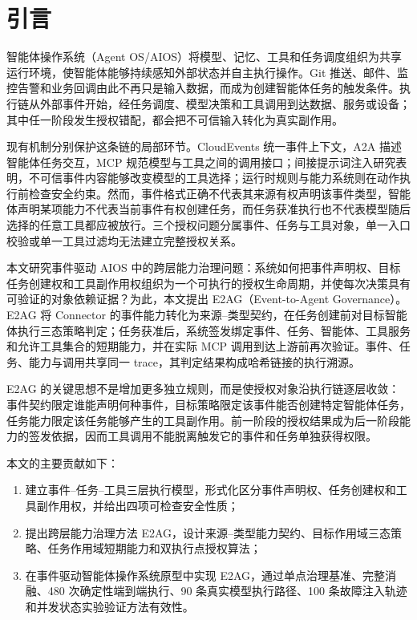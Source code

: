 \section{引言}\label{sec:introduction-v1}

智能体操作系统（Agent OS/AIOS）将模型、记忆、工具和任务调度组织为共享运行环境，使智能体能够持续感知外部状态并自主执行操作\cite{aios,agent-survey}。Git 推送、邮件、监控告警和业务回调由此不再只是输入数据，而成为创建智能体任务的触发条件。执行链从外部事件开始，经任务调度、模型决策和工具调用到达数据、服务或设备；其中任一阶段发生授权错配，都会把不可信输入转化为真实副作用。

现有机制分别保护这条链的局部环节。CloudEvents 统一事件上下文，A2A 描述智能体任务交互，MCP 规范模型与工具之间的调用接口\cite{cloudevents,a2a,mcp}；间接提示词注入研究表明，不可信事件内容能够改变模型的工具选择\cite{indirect-pi,injecagent,agentdojo}；运行时规则与能力系统则在动作执行前检查安全约束\cite{agentspec,camel}。然而，事件格式正确不代表其来源有权声明该事件类型，智能体声明某项能力不代表当前事件有权创建任务，而任务获准执行也不代表模型随后选择的任意工具都应被放行。三个授权问题分属事件、任务与工具对象，单一入口校验或单一工具过滤均无法建立完整授权关系。

本文研究事件驱动 AIOS 中的跨层能力治理问题：系统如何把事件声明权、目标任务创建权和工具副作用权组织为一个可执行的授权生命周期，并使每次决策具有可验证的对象依赖证据？为此，本文提出 E2AG（Event-to-Agent Governance）。E2AG 将 Connector 的事件能力转化为来源--类型契约，在任务创建前对目标智能体执行三态策略判定；任务获准后，系统签发绑定事件、任务、智能体、工具服务和允许工具集合的短期能力，并在实际 MCP 调用到达上游前再次验证。事件、任务、能力与调用共享同一 trace，其判定结果构成哈希链接的执行溯源。

E2AG 的关键思想不是增加更多独立规则，而是使授权对象沿执行链逐层收敛：事件契约限定谁能声明何种事件，目标策略限定该事件能否创建特定智能体任务，任务能力限定该任务能够产生的工具副作用。前一阶段的授权结果成为后一阶段能力的签发依据，因而工具调用不能脱离触发它的事件和任务单独获得权限。

本文的主要贡献如下：

\begin{enumerate}[label=(\arabic*)]
\item 建立事件--任务--工具三层执行模型，形式化区分事件声明权、任务创建权和工具副作用权，并给出四项可检查安全性质；
\item 提出跨层能力治理方法 E2AG，设计来源--类型能力契约、目标作用域三态策略、任务作用域短期能力和双执行点授权算法；
\item 在事件驱动智能体操作系统原型中实现 E2AG，通过单点治理基准、完整消融、480 次确定性端到端执行、90 条真实模型执行路径、100 条故障注入轨迹和并发状态实验验证方法有效性。
\end{enumerate}

